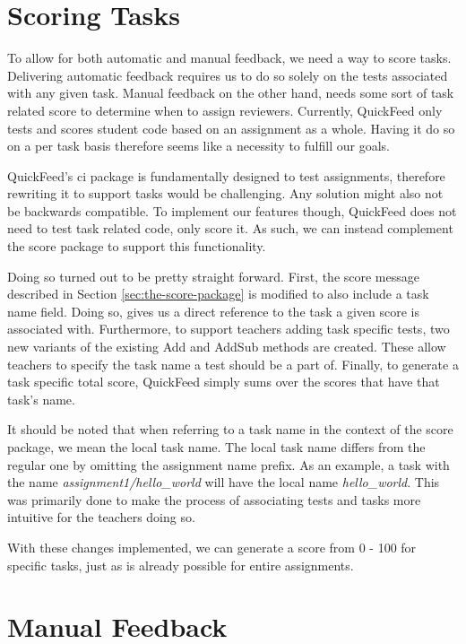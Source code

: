 \section{Scoring Tasks}

To allow for both automatic and manual feedback, we need a way to score tasks.
Delivering automatic feedback requires us to do so solely on the tests associated with any given task.
Manual feedback on the other hand, needs some sort of task related score to determine when to assign reviewers.
Currently, QuickFeed only tests and scores student code based on an assignment as a whole.
Having it do so on a per task basis therefore seems like a necessity to fulfill our goals.

QuickFeed's ci package is fundamentally designed to test assignments, therefore rewriting it to support tasks would be challenging.
Any solution might also not be backwards compatible.
To implement our features though, QuickFeed does not need to test task related code, only score it.
As such, we can instead complement the score package to support this functionality.

Doing so turned out to be pretty straight forward.
First, the score message described in Section \ref{sec:the-score-package} is modified to also include a task name field.
Doing so, gives us a direct reference to the task a given score is associated with.
Furthermore, to support teachers adding task specific tests, two new variants of the existing Add and AddSub methods are created.
These allow teachers to specify the task name a test should be a part of.
Finally, to generate a task specific total score, QuickFeed simply sums over the scores that have that task's name.

It should be noted that when referring to a task name in the context of the score package, we mean the local task name.
The local task name differs from the regular one by omitting the assignment name prefix.
As an example, a task with the name \textit{assignment1/hello\_world} will have the local name \textit{hello\_world}.
This was primarily done to make the process of associating tests and tasks more intuitive for the teachers doing so.

With these changes implemented, we can generate a score from 0 - 100 for specific tasks, just as is already possible for entire assignments.

\section{Manual Feedback}

